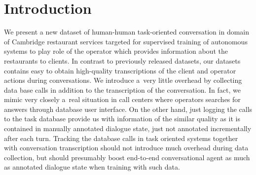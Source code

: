 \documentclass[runningheads,a4paper]{llncs}
\begin{document}

\section{Introduction}\label{sec:intro}
We present a new dataset of human-human task-oriented conversation in domain of Cambridge restaurant services targeted for supervised training of autonomous systems to play role of the operator which provides information about the restaurants to clients.
In contrast to previously released datasets, our datasets contains easy to obtain high-quality transcriptions of the client and operator actions during conversations.
We introduce a~very little overhead by collecting data base calls in addition to the transcription of the conversation. 
In fact, we mimic very closely a~real situation in call centers where operators searches for answers through database user interface. 
On the other hand, just logging the calls to the task database provide us with information of the similar quality as it is contained in manually annotated dialogue state, just not annotated incrementally after each turn.
Tracking the database calls in task oriented systems together with conversation transcription should not introduce much overhead during data collection, but should presumably boost end-to-end conversational agent as much as annotated dialogue state when training with such data.
\end{document}
